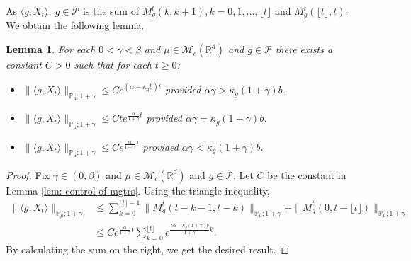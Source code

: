 \documentclass[12pt,oneside,english]{amsart}
\theoremstyle{plain}
\newtheorem{lem}[thm]{Lemma}
\theoremstyle{definition}
\numberwithin{equation}{section}
\begin{document}
\begin{comment}
     \\ & = (C_g c_{\lfloor t \rfloor})^{1+\gamma}+(1+\gamma)\int_{C_g c_{\lfloor t \rfloor}}^\infty \lambda^{\gamma}\mathbb P_\mu(|\langle T^{\alpha}_{\lfloor t \rfloor}g,X_{t-\lfloor t\rfloor}\rangle-\langle T^{\alpha}_t g, \mu\rangle|> \lambda) d\lambda
     \\ &\leq \Big(1+\frac{1+\gamma}{\beta-\gamma}\langle \tilde{R}^g_3, \mu\rangle\Big) (C_g c_{\lfloor t \rfloor})^{1+\gamma}\leq \Big(1+\frac{1+\gamma}{\beta-\gamma}\langle \tilde{R}^g_3, \mu\rangle\Big) C_g^{1+\gamma}e^{\alpha t}e^{(\alpha \gamma - \kappa b(1+\gamma))\lfloor t \rfloor}.
 \qedhere
\end{align}
\end{proof}
}
\end{comment}
    As $\langle g,X_t\rangle,~g\in \mathcal{P}$ is the sum of $M_g^t(k,k+1), k=0,1,...,\lfloor t\rfloor$ and $M_g^t(\lfloor t\rfloor, t)$. We obtain the following lemma.

\begin{lem}
\label{lemma24}
    For each $0 < \gamma < \beta$ and $\mu\in \mathcal M_c(\mathbb R^d)$ and $g\in \mathcal P$ there exists a constant $C>0$ such that for each $t\geq 0$:
\begin{itemize}
\item[(1)]
    $\|\langle g,X_t\rangle\|_{\mathbb{P}_{\mu};1+\gamma}\leq C e^{(\alpha-\kappa_g b)t}$ provided $\alpha\gamma > \kappa_g (1+\gamma)b$.
\item[(2)]
    $\|\langle g,X_t\rangle\|_{\mathbb{P}_{\mu};1+\gamma}\leq C te^{\frac{\alpha}{1+\gamma}t}$ provided $\alpha\gamma = \kappa_g (1+\gamma)b$.
\item[(3)]
    $\|\langle g,X_t\rangle\|_{\mathbb{P}_{\mu};1+\gamma}\leq C e^{\frac{\alpha}{1+\gamma}t}$ provided $\alpha\gamma < \kappa_g (1+\gamma)b$.
\end{itemize}
\end{lem}
\begin{proof}
    Fix $\gamma \in (0,\beta)$ and $\mu \in \mathcal M_c(\mathbb R^d)$ and $g\in \mathcal P$.
    Let $C$ be the constant in Lemma \ref{lem: control of mgtrs}.
    Using the triangle inequality,
\begin{align}
    \|\langle g,X_t\rangle\|_{\mathbb P_\mu;1+\gamma}
    &\leq \sum_{k=0}^{\lfloor t\rfloor - 1}\| M_g^t(t-k-1,t-k)\|_{\mathbb P_\mu;1+\gamma}+\|M_g^t(0, t-\lfloor t \rfloor)\|_{\mathbb P_\mu;1+\gamma}
    \\ &\leq C e^{\frac{\alpha}{1+\gamma}t}\sum_{k=0}^{\lfloor t\rfloor} e^{\frac{\gamma\alpha-\kappa_g (1+\gamma)b}{1+\gamma} k} .
\end{align}
    By calculating the sum on the right, we get the desired result.
\end{proof}
\end{document}
